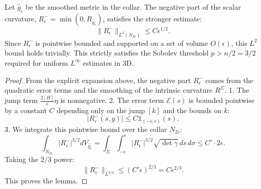 \begin{lemma}
\label{lem:ScalarDip}
Let $\hat{g}_\epsilon$ be the smoothed metric in the collar. The negative part of the scalar curvature, $R^-_\epsilon = \min(0, R_{\hat{g}_\epsilon})$, satisfies the stronger estimate:
\begin{equation}
    \|R^-_\epsilon\|_{L^{2}(N_{2\epsilon})} \le C \epsilon^{1/2}.
\end{equation}
Since $R^-_\epsilon$ is pointwise bounded and supported on a set of volume $O(\epsilon)$, this $L^2$ bound holds trivially. This strictly satisfies the Sobolev threshold $p > n/2 = 3/2$ required for uniform $L^\infty$ estimates in 3D.
\end{lemma}
\begin{proof}
From the explicit expansion above, the negative part $R^-_\epsilon$ comes from the quadratic error terms and the smoothing of the intrinsic curvature $R^\Sigma$.
1. The jump term $\frac{2[H]}{\epsilon}\eta$ is nonnegative.
2. The error term $\mathcal{E}(s)$ is bounded pointwise by a constant $C$ depending only on the jump $[k]$ and the bounds on $k$:
\[ |R^-_\epsilon(s,y)| \le C \mathbb{1}_{(-\epsilon, \epsilon)}(s). \]
3. We integrate this pointwise bound over the collar $N_{2\epsilon}$:
\[ \int_{N_{2\epsilon}} |R^-_\epsilon|^{3/2} dV_{\hat{g}_\epsilon} = \int_\Sigma \int_{-\epsilon}^\epsilon |R^-_\epsilon|^{3/2} \sqrt{\det \gamma} \, ds \, d\sigma \le C' \cdot 2\epsilon. \]
Taking the $2/3$ power:
\[ \|R^-_\epsilon\|_{L^{3/2}} \le (C' \epsilon)^{2/3} = C \epsilon^{2/3}. \]
This proves the lemma.
\end{proof}
